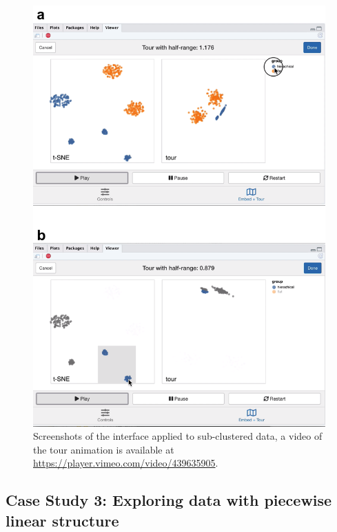 \documentclass[article,notitle]{jdssv}
\begin{document}
\begin{figure}

{\centering \includegraphics[width=\textwidth,height=0.75\textheight]{./img/liminal-screenshot-hierarchical} 

}

\caption{Screenshots of the  interface applied to sub-clustered data, a video of the tour animation is available at \url{https://player.vimeo.com/video/439635905}.}\label{fig:hierarchical}
\end{figure}

\hypertarget{case-study-3-exploring-data-with-piecewise-linear-structure}{%
\subsection{Case Study 3: Exploring data with piecewise linear structure}\label{case-study-3-exploring-data-with-piecewise-linear-structure}}
\end{document}
